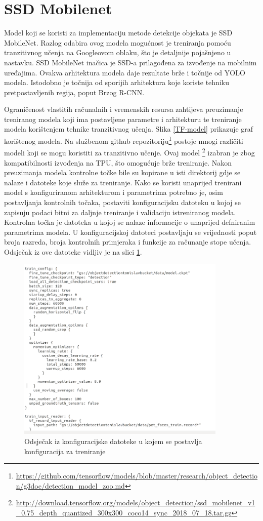 \section{SSD Mobilenet}
Model koji se koristi za implementaciju metode detekcije objekata je SSD MobileNet.
Razlog odabira ovog modela mogućnost je treniranja pomoću tranzitivnog učenja na Googleovom oblaku, što je detaljnije pojašnjeno u nastavku.
SSD MobileNet inačica je SSD-a prilagođena za izvođenje na mobilnim uređajima.
Ovakva arhitektura modela daje rezultate brže i točnije od YOLO modela. Istodobno je točnija od 
sporijih arhitektura koje koriste tehniku pretpostavljenih regija, poput Brzog R-CNN. \citep{DBLP:journals/corr/LiuAESR15}

Ograničenost vlastitih računalnih i vremenskih resursa zahtijeva preuzimanje treniranog modela koji ima postavljene parametre i arhitekturu te treniranje modela korištenjem tehnike tranzitivnog učenja.
Slika \ref{TF-model} prikazuje graf korištenog modela.
Na službenom github repozitoriju\footnote{\url{https://github.com/tensorflow/models/blob/master/research/object_detection/g3doc/detection_model_zoo.md}}
postoje mnogi različiti modeli koji se mogu koristiti za tranzitivno učenje. Ovaj model \footnote{\url{http://download.tensorflow.org/models/object_detection/ssd_mobilenet_v1_0.75_depth_quantized_300x300_coco14_sync_2018_07_18.tar.gz}}
izabran je zbog kompatibilnosti izvođenja na TPU, što omogućuje brže treniranje. Nakon preuzimanja modela kontrolne točke bile su kopirane u isti direktorij gdje se nalaze i datoteke koje služe za treniranje. 
Kako se koristi unaprijed trenirani model s konfiguriranom arhitekturom i parametrima potrebno je, osim postavljanja kontrolnih točaka, postaviti konfiguracijsku datoteku u kojoj se zapisuju podaci bitni za daljnje treniranje i
validaciju istreniranog modela. Kontrolna točka je datoteka u kojoj se nalaze informacije o unaprijed defniranim parametrima modela. U konfiguracijskoj datoteci postavljaju se vrijednosti poput broja razreda, broja kontrolnih primjeraka i funkcije za računanje stope učenja. 
Odsječak iz ove datoteke vidljiv je na slici \ref{Pipeline}.

\begin{figure}[htb]
    \centering
    \includegraphics[width=10cm]{img/pipeline.png}
    \caption{Odsječak iz konfiguracijske datoteke u kojem se postavlja konfiguracija za treniranje}
    \label{Pipeline}
\end{figure}


